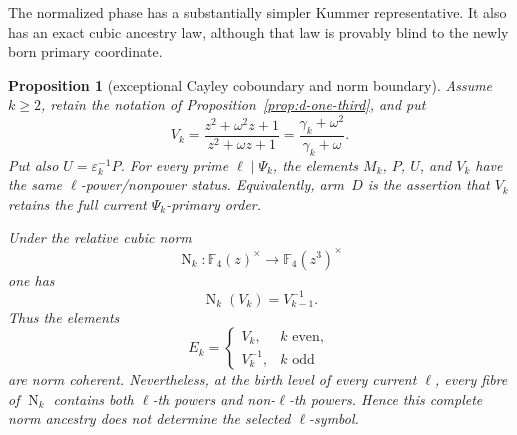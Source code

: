 \documentclass[11pt]{article}
\newtheorem{proposition}[theorem]{Proposition}
\theoremstyle{definition}
\theoremstyle{remark}
\begin{document}
The normalized phase has a substantially simpler Kummer representative.  It
also has an exact cubic ancestry law, although that law is provably blind to
the newly born primary coordinate.

\begin{proposition}[exceptional Cayley coboundary and norm boundary]
\label{prop:d-cayley}
Assume $k\geq2$, retain the notation of
Proposition~\ref{prop:d-one-third}, and put
\[
 V_k=\frac{z^2+\omega^2z+1}{z^2+\omega z+1}
     =\frac{\gamma_k+\omega^2}{\gamma_k+\omega}.
\]
Put also $U=\varepsilon_k^{-1}P$.
For every prime $\ell\mid\Psi_k$, the elements $M_k$, $P$, $U$, and $V_k$
have the same $\ell$-power/nonpower status.  Equivalently, arm~$D$ is the
assertion that $V_k$ retains the full current $\Psi_k$-primary order.

Under the relative cubic norm
\[
 \operatorname N_k:\mathbb F_4(z)^\times
       \longrightarrow\mathbb F_4(z^3)^\times
\]
one has
\[
 \operatorname N_k(V_k)=V_{k-1}^{-1}.
\]
Thus the elements
\[
 E_k=\begin{cases}V_k,&k\text{ even},\\V_k^{-1},&k\text{ odd}
 \end{cases}
\]
are norm coherent.  Nevertheless, at the birth level of every current
$\ell$, every fibre of $\operatorname N_k$ contains both $\ell$-th powers
and non-$\ell$-th powers.  Hence this complete norm ancestry does not
determine the selected $\ell$-symbol.
\end{proposition}
\end{document}
